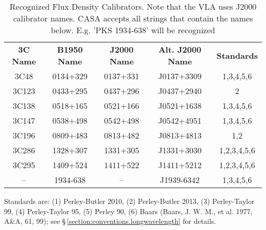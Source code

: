 \vspace{5mm}
\begin{table}[h!]
\caption{Recognized Flux Density Calibrators. Note that the VLA uses
J2000 calibrator names. CASA accepts all strings that contain the
names below. E.g. 'PKS 1934-638' will be recognized
        {\label{table:fluxcal-table}}}
\begin{center}
\begin{tabular}{|ccccc|} \hline
 {\bf 3C Name}  & {\bf B1950 Name}& {\bf J2000 Name} & {\bf Alt. J2000
   Name} & {\bf Standards}\\
3C48  &  0134+329 &  0137+331 &  J0137+3309 & 1,3,4,5,6  \\
3C123 &  0433+295 &  0437+296 &  J0437+2940 &      2 \\
3C138 &  0518+165 &  0521+166 &  J0521+1638 &      1,3,4,5,6\\
3C147 &  0538+498 &  0542+498 &  J0542+4951 &      1,3,4,5,6\\
3C196 &  0809+483 &  0813+482 &  J0813+4813 &      1,2 \\
3C286 &  1328+307 &  1331+305 &  J1331+3030 &      1,2,3,4,5,6\\
3C295 &  1409+524 &  1411+522 &  J1411+5212 &      1,2,3,4,5,6\\
 --   &  1934-638 &    --     &  J1939-6342 &      1,3,4,5,6\\
\hline
\end{tabular}
\end{center}
Standards are: (1) Perley-Butler 2010, (2) Perley-Butler 2013, (3) Perley-Taylor 99, (4)
Perley-Taylor 95, (5) Perley 90, (6) Baars (Baars, J. W. M., et
al. 1977, A\&A, 61, 99); see
\S\,\ref{section:conventions.longwavelength} for details.
\end{table}



